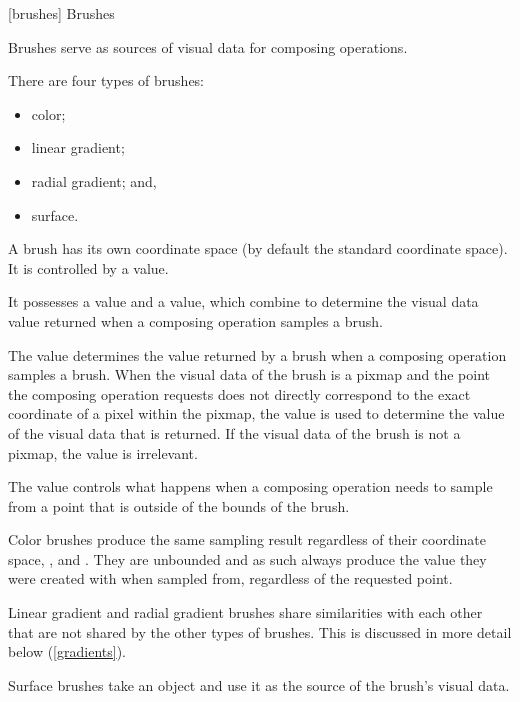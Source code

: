 
 [brushes] {Brushes}

\pnum
Brushes serve as sources of visual data for composing operations.

There are four types of brushes:
\begin{itemize}
	\item color;
	\item linear gradient;
	\item radial gradient; and,
	\item surface.
\end{itemize}

\pnum
A brush has its own coordinate space (by default the standard coordinate space). It is controlled by a  value.

\pnum
It possesses a  value and a  value, which combine to determine the visual data value returned when a composing operation samples a brush.

\pnum
The  value determines the value returned by a brush when a composing operation samples a brush. When the visual data of the brush is a pixmap and the point the composing operation requests does not directly correspond to the exact coordinate of a pixel within the pixmap, the  value is used to determine the value of the visual data that is returned. If the visual data of the brush is not a pixmap, the  value is irrelevant.

\pnum
The  value controls what happens when a composing operation needs to sample from a point that is outside of the bounds of the brush.

%

\pnum
Color brushes produce the same sampling result regardless of their coordinate space, , and . They are unbounded and as such always produce the  value they were created with when sampled from, regardless of the requested point.

\pnum
Linear gradient and radial gradient brushes share similarities with each other that are not shared by the other types of brushes. This is discussed in more detail below (\ref{gradients}).

\pnum
Surface brushes take an  object and use it as the source of the brush's visual data.

\addtocounter{SectionDepthBase}{1}






%
%
%
%
\addtocounter{SectionDepthBase}{-1}
